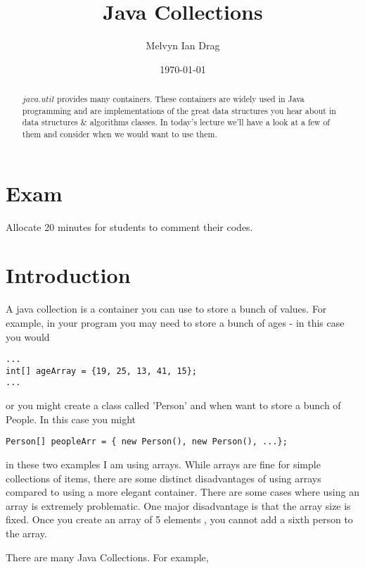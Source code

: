 \documentclass[12pt]{article}
\title{Java Collections}
\author{
	Melvyn Ian Drag
}
\date{\today}
\begin{document}
\maketitle

\begin{abstract}
$java.util$ provides many containers. These containers are widely used in Java programming and are implementations of the great data structures you hear about in data structures \& algorithms classes. In today's lecture we'll have a look at a few of them and consider when we would want to use them.
\end{abstract}

\section{Exam}
Allocate 20 minutes for students to comment their codes.

\section{Introduction}
A java collection is a container you can use to store a bunch of values. For example, in your program you may need to store a bunch of ages - in this case you would

\begin{lstlisting}
...
int[] ageArray = {19, 25, 13, 41, 15};
...
\end{lstlisting} 

or you might create a class called 'Person' and when want to store a bunch of People. In this case you might

\begin{lstlisting}
Person[] peopleArr = { new Person(), new Person(), ...};
\end{lstlisting}

in these two examples I am using arrays. While arrays are fine for simple collections of items, there are some distinct disadvantages of using arrays compared to using a more elegant container. There are some cases where using an array is extremely problematic. One major disadvantage is that the array size is fixed. Once you create an array of 5  elements , you cannot add a sixth person to the array.  

There are many Java Collections. For example, 
\end{document}
